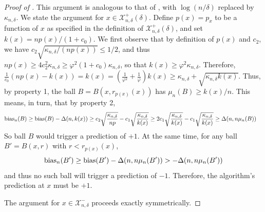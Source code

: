 \documentclass{article}
\def\X{{\mathcal X}}
\def\bias{{\rm bias}}
\begin{document}
\begin{proof}[Proof of ]
This argument is analogous to that of , with $\log (n/\delta)$ replaced by $\kappa_{n, \delta}$. We state the argument for $x \in \X^+_{n,\delta} (\delta)$. Define $p(x) = p_x$ to be a function of $x$ as specified in the definition of $\X^+_{n,\delta} (\delta)$, and set $k(x) = np(x) / (1 + c_0)$. We first observe that by definition of $p(x)$ and $c_2$, we have $c_2 \sqrt{\kappa_{n, \delta}/(n p(x))} \leq 1/2$, and thus $np(x) \geq 4 c_2^2 \kappa_{n, \delta} \geq \varphi^2 (1+c_0) \kappa_{n, \delta}$, so that $k(x) \geq \varphi^2 \kappa_{n, \delta}$. Therefore, $\frac{1}{c_0} (np(x) - k(x)) = k(x) = \left( \frac{1}{\varphi^2} + \frac{1}{\varphi} \right) k(x) \geq \kappa_{n, \delta} + \sqrt{ \kappa_{n, \delta} k(x) }$. Thus, by property 1, the ball $B = B(x, r_{p(x)} (x))$ has $\mu_n(B) \geq k(x)/n$. This means, in turn, that by property 2, 
\begin{align*}
\bias_n(B) &\geq \bias(B) - \Delta(n, k(x) ) 
\geq c_2 \sqrt{\frac{\kappa_{n, \delta}}{np}} - c_1 \sqrt{\frac{\kappa_{n, \delta}}{k(x)}} 
\geq 2c_1 \sqrt{\frac{\kappa_{n, \delta}}{k(x)}} - c_1 \sqrt{\frac{\kappa_{n, \delta}}{k(x)}} 
\geq \Delta(n, n \mu_n(B))
\end{align*}
So ball $B$ would trigger a prediction of $+1$.
At the same time, for any ball $B' = B(x, r)$ with $r < r_{p(x)} (x)$,
$$ \bias_n(B') \geq \bias(B') - \Delta(n, n \mu_n(B')) > -\Delta(n, n \mu_n(B')) $$
and thus no such ball will trigger a prediction of $-1$. Therefore, the algorithm's prediction at $x$ must be $+1$.

The argument for $x \in \X^-_{n,\delta}$ proceeds exactly symmetrically. 
\end{proof}
\end{document}
